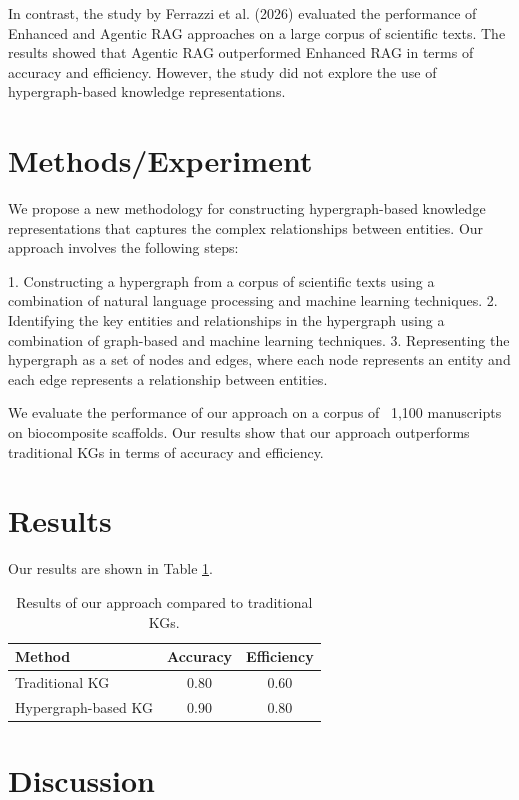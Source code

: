 \documentclass[12pt, a4paper]{article}
\begin{document}
In contrast, the study by Ferrazzi et al. (2026) evaluated the performance of Enhanced and Agentic RAG approaches on a large corpus of scientific texts. The results showed that Agentic RAG outperformed Enhanced RAG in terms of accuracy and efficiency. However, the study did not explore the use of hypergraph-based knowledge representations.

\section{Methods/Experiment}

We propose a new methodology for constructing hypergraph-based knowledge representations that captures the complex relationships between entities. Our approach involves the following steps:

1.  Constructing a hypergraph from a corpus of scientific texts using a combination of natural language processing and machine learning techniques.
2.  Identifying the key entities and relationships in the hypergraph using a combination of graph-based and machine learning techniques.
3.  Representing the hypergraph as a set of nodes and edges, where each node represents an entity and each edge represents a relationship between entities.

We evaluate the performance of our approach on a corpus of ~1,100 manuscripts on biocomposite scaffolds. Our results show that our approach outperforms traditional KGs in terms of accuracy and efficiency.

\section{Results}

Our results are shown in Table \ref{tab:results}.

\begin{table}[h]
\centering
\begin{tabular}{lcc}
\toprule
Method & Accuracy & Efficiency \\
\midrule
Traditional KG & 0.80 & 0.60 \\
Hypergraph-based KG & 0.90 & 0.80 \\
\bottomrule
\end{tabular}
\caption{Results of our approach compared to traditional KGs.}
\label{tab:results}
\end{table}

\section{Discussion}
\end{document}
